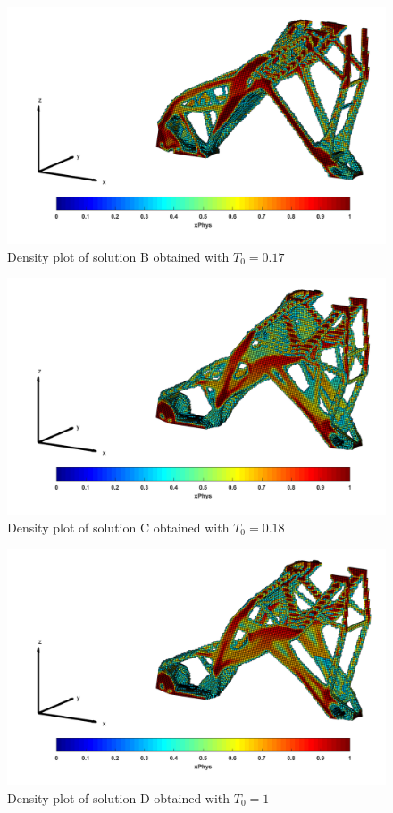 \begin{figure}[ht]
 \centering
\includegraphics[width=\textwidth]{images/Ch2/SOL_B}
 \caption{Density plot of solution B obtained with $T_0=0.17$}
\label{fig.B23}
\end{figure}
\begin{figure}[ht]
 \centering
\includegraphics[width=\textwidth]{images/Ch2/SOL_C}
 \caption{Density plot of solution C obtained with $T_0=0.18$}
\label{fig.B24}
\end{figure}
\begin{figure}[ht]
 \centering
\includegraphics[width=\textwidth]{images/Ch2/SOL_D}
 \caption{Density plot of solution D obtained with $T_0=1$}
\label{fig.B25}
\end{figure}
